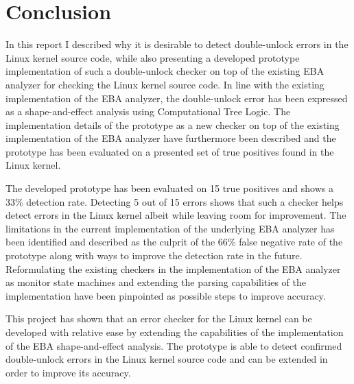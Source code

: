 \section{Conclusion}

In this report I described why it is desirable to detect double-unlock errors in the Linux kernel source code, while also presenting a developed prototype implementation of such a double-unlock checker on top of the existing EBA analyzer for checking the Linux kernel source code. In line with the existing implementation of the EBA analyzer, the double-unlock error has been expressed as a shape-and-effect analysis using Computational Tree Logic. The implementation details of the prototype as a new checker on top of the existing implementation of the EBA analyzer have furthermore been described and the prototype has been evaluated on a presented set of true positives found in the Linux kernel.

\newpar The developed prototype has been evaluated on 15 true positives and shows a 33\% detection rate. Detecting 5 out of 15 errors shows that such a checker helps detect errors in the Linux kernel albeit while leaving room for improvement. The limitations in the current implementation of the underlying EBA analyzer has been identified and described as the culprit of the 66\% false negative rate of the prototype along with ways to improve the detection rate in the future. Reformulating the existing checkers in the implementation of the EBA analyzer as monitor state machines and extending the parsing capabilities of the implementation have been pinpointed as possible steps to improve accuracy.

\newpar This project has shown that an error checker for the Linux kernel can be developed with relative ease by extending the capabilities of the implementation of the EBA shape-and-effect analysis. The prototype is able to detect confirmed double-unlock errors in the Linux kernel source code and can be extended in order to improve its accuracy.